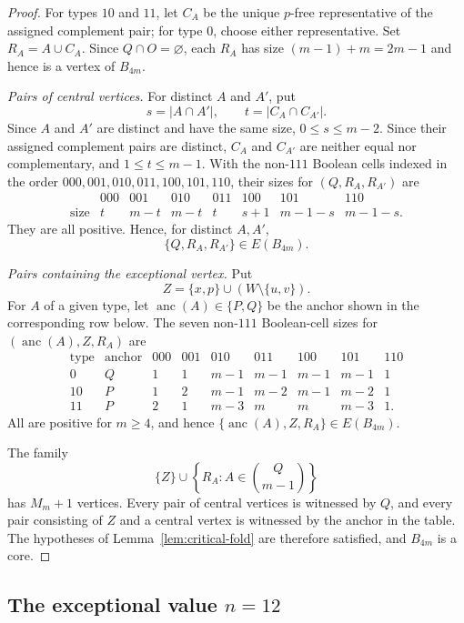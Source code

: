 \documentclass[11pt]{article}
\begin{document}
\begin{proof}
For types \(10\) and \(11\), let \(C_A\) be the unique \(p\)-free
representative of the assigned complement pair; for type \(0\), choose
either representative.  Set \(R_A=A\cup C_A\).  Since \(Q\cap O=\varnothing\),
each \(R_A\) has size \((m-1)+m=2m-1\) and hence is a vertex of \(B_{4m}\).

\emph{Pairs of central vertices.}
For distinct \(A\) and \(A'\), put
\[
s=|A\cap A'|,\qquad t=|C_A\cap C_{A'}|.
\]
Since \(A\) and \(A'\) are distinct and have the same size,
\(0\le s\le m-2\).  Since their assigned complement pairs are distinct,
\(C_A\) and \(C_{A'}\) are neither equal nor complementary, and
\(1\le t\le m-1\).  With the non-\(111\) Boolean cells indexed in the order
\(000,001,010,011,100,101,110\), their sizes for
\((Q,R_A,R_{A'})\) are
\[
\begin{array}{c|ccccccc}
 &000&001&010&011&100&101&110\\ \hline
\text{size}
 &t&m-t&m-t&t&s+1&m-1-s&m-1-s.
\end{array}
\]
They are all positive.  Hence, for distinct \(A,A'\),
\[
\{Q,R_A,R_{A'}\}\in E(B_{4m}).
\]

\emph{Pairs containing the exceptional vertex.}
Put
\[
Z=\{x,p\}\cup(W\setminus\{u,v\}).
\]
For \(A\) of a given type, let
\(\operatorname{anc}(A)\in\{P,Q\}\) be the anchor shown in the corresponding
row below.  The seven non-\(111\) Boolean-cell sizes for
\((\operatorname{anc}(A),Z,R_A)\) are
\[
\begin{array}{c|c|ccccccc}
\text{type}&\text{anchor}&000&001&010&011&100&101&110\\ \hline
0&Q&1&1&m-1&m-1&m-1&m-1&1\\
10&P&1&2&m-1&m-2&m-1&m-2&1\\
11&P&2&1&m-3&m&m&m-3&1.
\end{array}
\]
All are positive for \(m\ge4\), and hence
\(\{\operatorname{anc}(A),Z,R_A\}\in E(B_{4m})\).

The family
\[
\{Z\}\cup\left\{R_A:A\in\binom{Q}{m-1}\right\}
\]
has \(M_m+1\) vertices.  Every pair of central vertices is witnessed by
\(Q\), and every pair consisting of \(Z\) and a central vertex is witnessed
by the anchor in the table.  The hypotheses of Lemma~\ref{lem:critical-fold}
are therefore satisfied, and \(B_{4m}\) is a core.
\end{proof}

\subsection{The exceptional value
\texorpdfstring{\(n=12\)}{n=12}}\label{subsec:n12}
\end{document}
